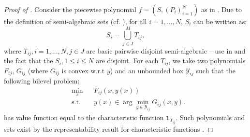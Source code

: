 \documentclass{article}
\newcommand{\mbf}[1]{\mathbf{#1}}
\newcommand*{\cY}{\mathcal{Y}}
\newcommand{\argmin}{\arg\min}
\newcommand{\tupfuncN}{(P_i)_{i = 1}^N}
\newcommand{\firstvar}{x}
\newcommand{\secondvar}{y}
\theoremstyle{plain}
\theoremstyle{definition}
\begin{document}
\begin{proof}[Proof of ]
    Consider the piecewise polynomial $f = (S, \tupfuncN)$ as in .
    Due to the definition of semi-algebraic sets (cf. ), for all $i = 1, \ldots, N$, $S_i$ can be written as:
    \begin{equation*}
        S_i = \bigcup_{j \in J}^M T_{ij},
    \end{equation*}
    where $T_{ij}, i = 1, \ldots, N, j \in J$ are basic pairwise disjoint semi-algebraic -- use  in  and the fact that the $S_i, 1 \leq i \leq N$ are disjoint.
    For each $T_{ij}$, we take two polynomials $F_{ij}$, $G_{ij}$ (where $G_{ij}$ is convex w.r.t $\secondvar$) and an unbounded box $\cY_{ij}$ such that the following bilevel problem:
    \begin{equation*}
        \begin{aligned}
            &\min_{\firstvar} && F_{ij}(\firstvar, \secondvar(\firstvar))\\
            &\text{s.t.} && \secondvar(\firstvar) \in \argmin_{\secondvar\in\cY_{ij}} G_{ij}(\firstvar, \secondvar).
    \end{aligned} 
    \end{equation*}
    has value function equal to the characteristic function $\mbf{1}_{T_{ij}}$. Such polynomials and sets exist by the representability result for characteristic functions . 


\end{proof}
\end{document}
